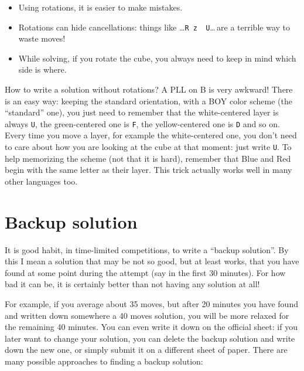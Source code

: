 \documentclass[11pt,a4paper]{book}
\newcommand{\p}{\textquotesingle}
\newcommand{\m}{\texttt}
\newcommand{\ps}{\p\,\,}
\begin{document}
\begin{itemize}
\item Using rotations, it is easier to make mistakes.
\item Rotations can hide cancellations: things like \dots\m{R z\ps U\p}\dots\,are a terrible way to waste moves!
\item While solving, if you rotate the cube, you always need to keep in mind which side is where.
\end{itemize}

How to write a solution without rotations? A PLL on B is very awkward! There is an easy way: keeping the standard orientation, with a BOY color scheme (the ``standard'' one), you just need to remember that the white-centered layer is always \m U, the green-centered one is \m F, the yellow-centered one is \m D and so on. Every time you move a layer, for example the white-centered one, you don't need to care about how you are looking at the cube at that moment: just write \m U.
To help memorizing the scheme (not that it is hard), remember that Blue and Red begin with the same letter as their layer. This trick actually works well in many other languages too.

\section{Backup solution}
It is good habit, in time-limited competitions, to write a ``backup solution''. By this I mean a solution that may be not so good, but at least works, that you have found at some point during the attempt (say in the first 30 minutes). For how bad it can be, it is certainly better than not having any solution at all!%

For example, if you average about 35 moves, but after 20 minutes you have found and written down somewhere a 40 moves solution, you will be more relaxed for the remaining 40 minutes. You can even write it down on the official sheet: if you later want to change your solution, you can delete the backup solution and write down the new one, or simply submit it on a different sheet of paper. There are many possible approaches to finding a backup solution:
\end{document}
